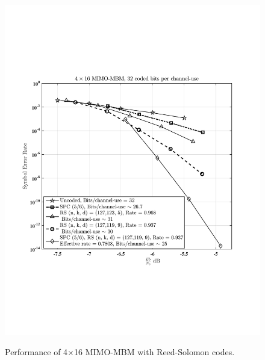 \begin{figure}[t]
\centering
\vspace{-1cm}

{\includegraphics[scale = 0.50 ]{./fig/mbm_coded}}
\caption{Performance of 4$\times$16 MIMO-MBM with Reed-Solomon codes.}

\label{RS_all}
\end{figure}


